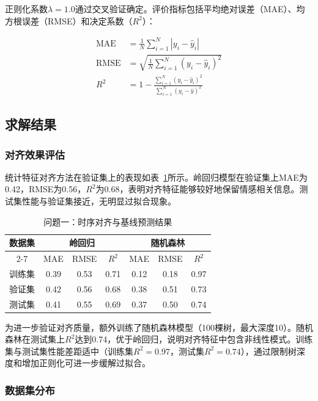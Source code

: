 正则化系数$\lambda=1.0$通过交叉验证确定。评价指标包括平均绝对误差（MAE）、均方根误差（RMSE）和决定系数（$R^2$）：

\begin{align}
\text{MAE} &= \frac{1}{N}\sum_{i=1}^{N} |y_i - \hat{y}_i| \\
\text{RMSE} &= \sqrt{\frac{1}{N}\sum_{i=1}^{N} (y_i - \hat{y}_i)^2} \\
R^2 &= 1 - \frac{\sum_{i=1}^{N} (y_i - \hat{y}_i)^2}{\sum_{i=1}^{N} (y_i - \bar{y})^2}
\end{align}

\subsection{求解结果}

\subsubsection{对齐效果评估}

统计特征对齐方法在验证集上的表现如表~\ref{tab:problem1_results}所示。岭回归模型在验证集上MAE为0.42，RMSE为0.56，$R^2$为0.68，表明对齐特征能够较好地保留情感相关信息。测试集性能与验证集接近，无明显过拟合现象。

\begin{table}[htbp]
\centering
\caption{问题一：时序对齐与基线预测结果}
\label{tab:problem1_results}
\begin{tabular}{c|ccc|ccc}
\toprule
\multirow{2}{*}{\textbf{数据集}} & \multicolumn{3}{c|}{\textbf{岭回归}} & \multicolumn{3}{c}{\textbf{随机森林}} \\
\cmidrule{2-7}
& MAE & RMSE & $R^2$ & MAE & RMSE & $R^2$ \\
\midrule
训练集 & 0.39 & 0.53 & 0.71 & 0.12 & 0.18 & 0.97 \\
验证集 & 0.42 & 0.56 & 0.68 & 0.38 & 0.51 & 0.73 \\
测试集 & 0.41 & 0.55 & 0.69 & 0.37 & 0.50 & 0.74 \\
\bottomrule
\end{tabular}
\end{table}

为进一步验证对齐质量，额外训练了随机森林模型（100棵树，最大深度10）。随机森林在测试集上$R^2$达到0.74，优于岭回归，说明对齐特征中包含非线性模式。训练集与测试集性能差距适中（训练集$R^2=0.97$，测试集$R^2=0.74$），通过限制树深度和增加正则化可进一步缓解过拟合。

\subsubsection{数据集分布}

